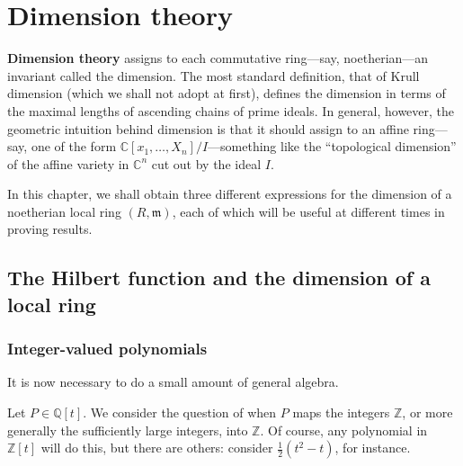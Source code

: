 \chapter{Dimension theory}

\label{chdimension}
\textbf{Dimension theory} assigns to each commutative ring---say,
noetherian---an invariant called the dimension. The most standard definition,
that of Krull dimension (which we shall not adopt at first), defines the
dimension in terms of the maximal lengths of ascending chains of prime ideals. 
In general, however, the geometric intuition behind dimension is that it
should assign to an affine ring---say, one of the form $\mathbb{C}[x_1, \dots,
X_n]/I$---something like the ``topological dimension'' of the affine variety
in $\mathbb{C}^n$ cut out by the ideal $I$. 

In this chapter, we shall obtain three different expressions for the dimension
of a noetherian local ring $(R, \mathfrak{m})$, each of which will be useful
at different times in proving results. 

\section{The Hilbert function and the dimension of a local ring}
\subsection{Integer-valued polynomials}

It is now necessary to do a small amount of general algebra.

Let $P \in \mathbb{Q}[t]$. We consider the question of when $P$ maps the
integers $\mathbb{Z}$, or more generally the sufficiently large integers, into
$\mathbb{Z}$. Of course, any polynomial in $\mathbb{Z}[t]$ will do this, but
there are others: consider $\frac{1}{2}(t^2 -t)$, for instance.

